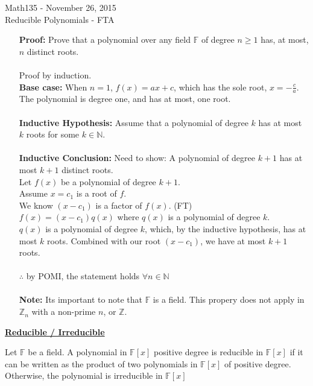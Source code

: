 \documentclass{letter}
\begin{document}
	\begin{center}
		\LARGE Math135 - November 26, 2015\\
		\large Reducible Polynomials - FTA
	\end{center}
	\vspace{0.25 in}
	\begin{itemize}
		\item[\textbf{Proof: }] Prove that a polynomial over any field $\mathbb{F}$ of degree $n \geq 1$ has, at most, $n$ distinct roots.\\\\
		Proof by induction.\\
		\textbf{Base case: } When $n=1$, $f(x) = ax + c$, which has the sole root, $x=-\frac{c}{a}$. The polynomial is degree one, and has at most, one root.\\\\
		\textbf{Inductive Hypothesis: } Assume that a polynomial of degree $k$ has at most $k$ roots for some $k \in \mathbb{N}$.\\\\
		\textbf{Inductive Conclusion: } Need to show: A polynomial of degree $k+1$ has at most $k+1$ distinct roots.\\
		Let $f(x)$ be a polynomial of degree $k+1$.\\
		Assume $x = c_1$ is a root of $f$.\\
		We know $(x-c_1)$ is a factor of $f(x)$. (FT)\\
		$f(x) = (x-c_1)q(x)$ where $q(x)$ is a polynomial of degree $k$.\\
		$q(x)$ is a polynomial of degree $k$, which, by the inductive hypothesis, has at most $k$ roots. Combined with our root $(x-c_1)$, we have at most $k+1$ roots.\\\\
		$\therefore$ by POMI, the statement holds $\forall n \in \mathbb{N}$\\\\
		\textbf{Note: } Its important to note that $\mathbb{F}$ is a field. This propery does not apply in $\mathbb{Z}_n$ with a non-prime $n$, or $\mathbb{Z}$.	
	\end{itemize}
	
	\underline{\textbf{Reducible / Irreducible}}
		
	Let $\mathbb{F}$ be a field. A polynomial in $\mathbb{F}\left[ x \right]$ positive degree is reducible in $\mathbb{F}\left[ x \right]$ if it can be written as the product of two polynomials in $\mathbb{F} \left[ x \right]$ of positive degree. Otherwise, the polynomial is irreducible in $\mathbb{F} \left[ x \right]$
	
\end{document}
